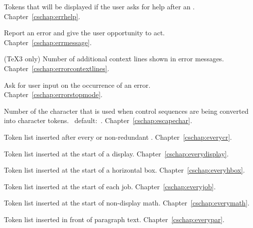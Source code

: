 \begin{glossinventory}
\item [\cs{errhelp}]
      Tokens that will be displayed if the user 
      asks for help after an .
Chapter~\ref{cschap:errhelp}.

\item [\cs{errmessage\gr{general text}}]
      Report an error and give the user opportunity to act.
Chapter~\ref{cschap:errmessage}.

\item [\cs{errorcontextlines}]
      (\TeX3 only)
      Number of additional context lines shown in error messages.
Chapter~\ref{cschap:errorcontextlines}.

\item [\cs{errorstopmode}]
      Ask for user input on the occurrence of an error.
Chapter~\ref{cschap:errorstopmode}.

\item [\cs{escapechar}] 
      Number of the character that is  used 
      when control sequences are being converted
      into character tokens.
      \IniTeX\ default:~.
Chapter~\ref{cschap:escapechar}.

\item [\cs{everycr}]
      Token list inserted after every  or non-redundant .
Chapter~\ref{cschap:everycr}.

\item [\cs{everydisplay}]
      Token list inserted at the start of a display.
Chapter~\ref{cschap:everydisplay}.

\item [\cs{everyhbox}]
      Token list inserted at the start of a horizontal box.
Chapter~\ref{cschap:everyhbox}.

\item [\cs{everyjob}]
      Token list inserted at the start of each job.
Chapter~\ref{cschap:everyjob}.

\item [\cs{everymath}]
      Token list inserted at the start of non-display math.
Chapter~\ref{cschap:everymath}.

\item [\cs{everypar}]
      Token list inserted in front of paragraph text.
Chapter~\ref{cschap:everypar}.


\end{glossinventory}

